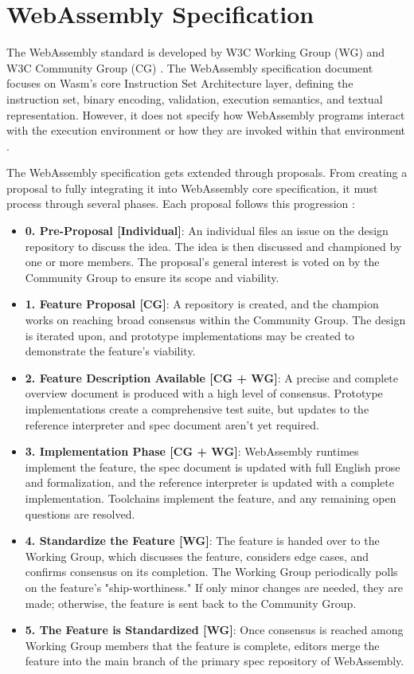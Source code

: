 \section{WebAssembly Specification}
\label{sec:wasm-specification}

The \gls{WebAssembly} standard is developed by W3C Working Group (WG) and W3C Community Group (CG) \cite{webassemblycommunitygroup_2023_webassembly}. The WebAssembly specification document \cite{webassemblycommunitygroup_2023_webassembly} focuses on Wasm's core Instruction Set Architecture layer, defining the instruction set, binary encoding, validation, execution semantics, and textual representation. However, it does not specify how WebAssembly programs interact with the execution environment or how they are invoked within that environment \cite{webassemblycommunitygroup_2023_webassembly}.


The WebAssembly specification gets extended through proposals. From creating a proposal to fully integrating it into WebAssembly core specification, it must process through several phases. Each proposal follows this progression \cite{webassemblyw3c_2023_webassembly}:
\begin{itemize}
  \item \textbf{0. Pre-Proposal [Individual]}: An individual files an issue on the design repository to discuss the idea. The idea is then discussed and championed by one or more members. 
  The proposal's general interest is voted on by the Community Group to ensure its scope and viability.
  \item \textbf{1. Feature Proposal [CG]}: A repository is created, and the champion works on reaching broad consensus within the Community Group. The design is iterated upon, and prototype implementations may be created to demonstrate the feature's viability.
  \item \textbf{2. Feature Description Available [CG + WG]}: A precise and complete overview document is produced with a high level of consensus. Prototype implementations create a comprehensive 
  test suite, but updates to the reference interpreter and spec document aren't yet required.
  \item \textbf{3. Implementation Phase [CG + WG]}: WebAssembly runtimes implement the feature, the spec document is updated with full English prose and formalization, and the reference interpreter is updated with a complete implementation. Toolchains implement the feature, and any remaining open questions are resolved.
  \item \textbf{4. Standardize the Feature [WG]}: The feature is handed over to the Working Group, which discusses the feature, considers edge cases, and confirms consensus on its completion. 
  The Working Group periodically polls on the feature's "ship-worthiness." If only minor changes are needed, they are made; otherwise, the feature is sent back to the Community Group.
  \item \textbf{5. The Feature is Standardized [WG]}: Once consensus is reached among Working Group members that the feature is complete, editors merge the feature into the main branch of the primary spec repository of WebAssembly.
\end{itemize}

